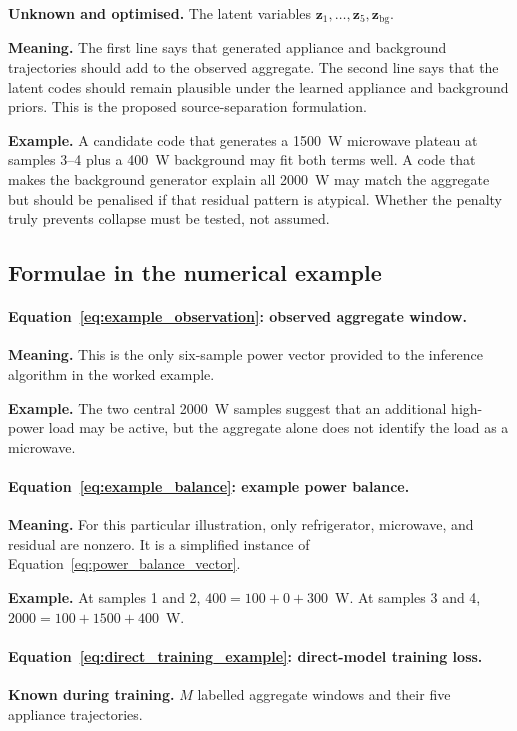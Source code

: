\documentclass[11pt]{article}
\newcommand{\vect}[1]{\mathbf{#1}}
\begin{document}
\textbf{Unknown and optimised.} The latent variables $\vect{z}_1,\ldots,\vect{z}_5,\vect{z}_{\mathrm{bg}}$.

\textbf{Meaning.} The first line says that generated appliance and background trajectories should add to the observed aggregate. The second line says that the latent codes should remain plausible under the learned appliance and background priors. This is the proposed source-separation formulation.

\textbf{Example.} A candidate code that generates a 1500~W microwave plateau at samples 3--4 plus a 400~W background may fit both terms well. A code that makes the background generator explain all 2000~W may match the aggregate but should be penalised if that residual pattern is atypical. Whether the penalty truly prevents collapse must be tested, not assumed.

\subsection{Formulae in the numerical example}

\paragraph{Equation~\eqref{eq:example_observation}: observed aggregate window.}
\textbf{Meaning.} This is the only six-sample power vector provided to the inference algorithm in the worked example.

\textbf{Example.} The two central 2000~W samples suggest that an additional high-power load may be active, but the aggregate alone does not identify the load as a microwave.

\paragraph{Equation~\eqref{eq:example_balance}: example power balance.}
\textbf{Meaning.} For this particular illustration, only refrigerator, microwave, and residual are nonzero. It is a simplified instance of Equation~\eqref{eq:power_balance_vector}.

\textbf{Example.} At samples 1 and 2, $400=100+0+300$~W. At samples 3 and 4, $2000=100+1500+400$~W.

\paragraph{Equation~\eqref{eq:direct_training_example}: direct-model training loss.}
\textbf{Known during training.} $M$ labelled aggregate windows and their five appliance trajectories.
\end{document}
